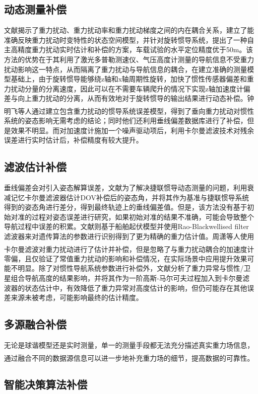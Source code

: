 \documentclass[12pt,a4,utf8]{article}
\newcommand{\upcite}[1]{\textsuperscript{\textsuperscript{\cite{#1}}}} %
\begin{document}
\subsection{动态测量补偿}
文献\cite{yang2024autonomous}揭示了重力扰动、重力扰动率和重力扰动梯度之间的内在耦合关系，建立了能准确反映重力扰动时变特性的状态空间模型，并针对旋转惯导系统，提出了一种自主高精度重力扰动实时估计和补偿的方案，车载试验的水平定位精度优于50m。该方法的优势在于其利用了激光多普勒测速仪、气压高度计测量的导航信息不受重力扰动影响这一特点，从而隔离了重力扰动与导航信息的耦合，在建立准确的测量模型基础上，由于旋转惯导能够绕z轴和x轴周期性旋转，加快了惯性传感器偏差和重力扰动分量的分离速度，因此可以在不需要车辆爬升的情况下实现z轴加速度计偏差与向上重力扰动的分离，从而有效地对于旋转惯导的输出结果进行动态补偿。钟明飞等人通过建立包含重力扰动的惯导系统误差模型\upcite{WXDH201505008015}，得到了垂向重力扰动对惯性系统的姿态影响无需考虑的结论；同时他们还利用垂线偏差数据库进行了补偿，但是效果不明显。而对加速度计施加一个噪声驱动项后，利用卡尔曼滤波技术对残余误差进行实时估计后，补偿精度有较大提升。
\subsection{滤波估计补偿}
垂线偏差会对引入姿态解算误差，文献\cite{an2021method}为了解决捷联惯导动态测量的问题，利用衰减记忆卡尔曼滤波器估计DOV补偿后的姿态角，并将其作为基准与捷联惯导系统得到的姿态角进行差分，得到最终轨迹上的垂线偏差值。但是，该方法没有基于初始对准的过程对姿态误差进行研究，如果初始对准的结果不准确，可能会导致整个导航过程中误差的积累。文献\cite{stepanov2020algorithms}则基于船舶起伏模型并使用Rao-Blackwellised filter滤波器来对遗传算法的参数进行识别得到了更为精确的重力估计值。周潇等人使用卡尔曼滤波对重力扰动进行了估计并补偿\upcite{ZGXJ201506005}，但是忽略了与重力扰动耦合的加速度计零偏，且仅验证了常值重力扰动的影响和补偿情况，在实际场景中应用提升效果可能不明显。除了对惯性导航系统参数进行补偿外，文献\cite{xiong2018analysis}分析了重力异常与惯性/卫星组合导航高度的结果影响，并将其作为一阶高斯-马尔可夫过程加入到卡尔曼滤波器的状态估计中，有效降低了重力异常对高度估计的影响，但仍可能存在其他误差来源未被考虑，可能影响最终的估计精度。
\subsection{多源融合补偿}
无论是球谐模型还是实时测量，单一的测量手段都无法充分描述真实重力场信息，通过融合不同的数据源信息可以进一步地补充重力场的细节，提高数据的可靠性\upcite{DKXB20050100F}。
\subsection{智能决策算法补偿}
\end{document}
